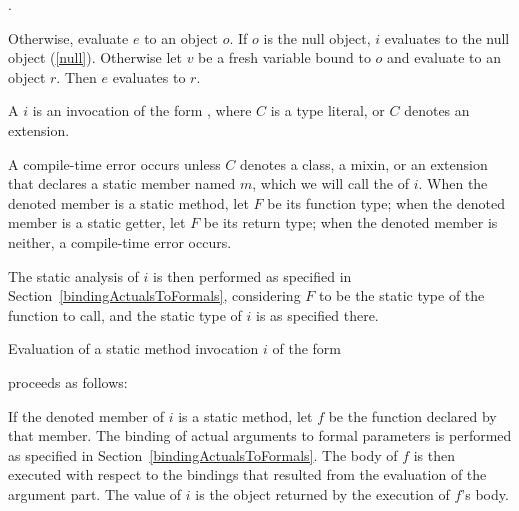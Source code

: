 \documentclass[makeidx]{article}
\begin{document}
{\noindent
{}.

\LMHash{}%
Otherwise, evaluate $e$ to an object $o$.
If $o$ is the null object, $i$ evaluates to the null object (\ref{null}).
Otherwise let $v$ be a fresh variable bound to $o$ and evaluate
to an object $r$.
Then $e$ evaluates to $r$.
\EndCase

\LMHash{}%
A 
$i$ is an invocation of the form
,
where $C$ is a type literal, or $C$ denotes an extension.


\LMHash{}%
A compile-time error occurs
unless $C$ denotes a class, a mixin, or an extension that declares
a static member named $m$,
which we will call the
of $i$.
When the denoted member is a static method, let $F$ be its function type;
when the denoted member is a static getter, let $F$ be its return type;
when the denoted member is neither, a compile-time error occurs.

\LMHash{}%
The static analysis of $i$ is then performed
as specified in Section~\ref{bindingActualsToFormals},
considering $F$ to be the static type of the function to call,
and the static type of $i$ is as specified there.

\LMHash{}%
Evaluation of a static method invocation $i$ of the form

\noindent
{}

\noindent
proceeds as follows:

\LMHash{}%
If the denoted member of $i$ is a static method,
let $f$ be the function declared by that member.
The binding of actual arguments to formal parameters is performed
as specified in Section~\ref{bindingActualsToFormals}.
The body of $f$ is then executed with respect to the bindings
that resulted from the evaluation of the argument part.
The value of $i$ is the object returned by the execution of $f$'s body.

}
\end{document}
